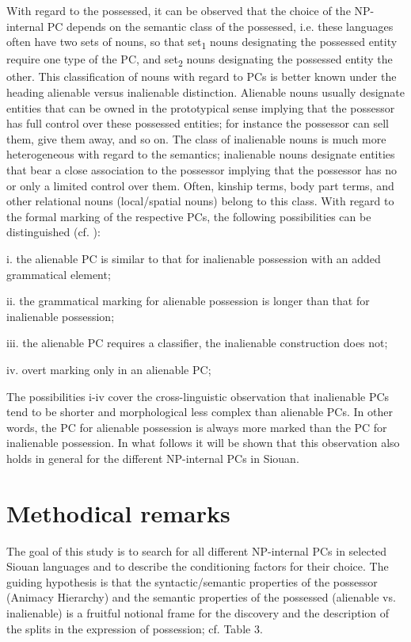 \documentclass[output=paper]{LSP/langsci}
\begin{document}
With regard to the possessed, it can be observed that the choice of the NP-internal PC depends on the semantic class of the possessed, i.e. these languages often have two sets of nouns, so that set\textsubscript{1} nouns designating the possessed entity require one type of the PC, and set\textsubscript{2} nouns designating the possessed entity the other. This classification of nouns with regard to PCs is better known under the heading alienable versus inalienable distinction. Alienable nouns usually designate entities that can be owned in the prototypical sense implying that the possessor has full control over these possessed entities; for instance the possessor can sell them, give them away, and so on. The class of inalienable nouns is much more heterogeneous with regard to the semantics; inalienable nouns designate entities that bear a close association to the possessor implying that the possessor has no or only a limited control over them. Often, kinship terms, body part terms, and other relational nouns (local/spatial nouns) belong to this class. 
With regard to the formal marking of the respective PCs, the following possibilities can be distinguished (cf. \citealt[286--290]{Dixon2010}):

\vspace{1em}
i.	the alienable PC is similar to that for inalienable possession with an added grammatical element;

ii.	the grammatical marking for alienable possession is longer than that for inalienable possession;

iii.	the alienable PC requires a classifier, the inalienable construction does not;

iv.	overt marking only in an alienable PC;
\vspace{1em}

The possibilities i-iv cover the cross-linguistic observation that inalienable PCs tend to be shorter and morphological less complex than alienable PCs. In other words, the PC for alienable possession is always more marked than the PC for inalienable possession. In what follows it will be shown that this observation also holds in general for the different NP-internal PCs in Siouan.

\section{Methodical remarks}

The goal of this study is to search for all different NP-internal PCs in selected Siouan languages and to describe the conditioning factors for their choice. The guiding hypothesis is that the syntactic/semantic properties of the possessor (Animacy Hierarchy) and the semantic properties of the possessed (alienable vs. inalienable) is a fruitful notional frame for the discovery and the description of the splits in the expression of possession; cf. Table 3. 
	
\end{document}
